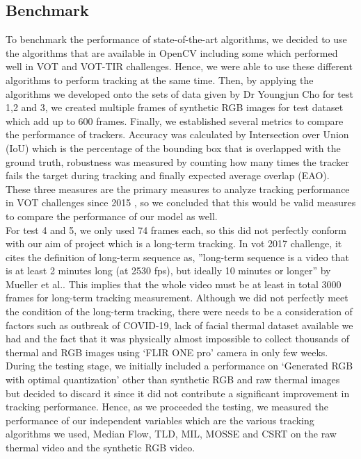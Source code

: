 \documentclass[conference]{IEEEtran}
\begin{document}
\subsection{Benchmark}
To benchmark the performance of state-of-the-art algorithms, we decided to use the algorithms that are available in OpenCV including some which performed well in VOT and VOT-TIR challenges. Hence, we were able to use these different algorithms to perform tracking at the same time. Then, by applying the algorithms we developed onto the sets of data given by Dr Youngjun Cho for test 1,2 and 3, we created multiple frames of synthetic RGB images for test dataset which add up to 600 frames. Finally, we established several metrics to compare the performance of trackers. Accuracy was calculated by Intersection over Union (IoU) which is the percentage of the bounding box that is overlapped with the ground truth, robustness was measured by counting how many times the tracker fails the target during tracking and finally expected average overlap (EAO). These three measures are the primary measures to analyze tracking performance in VOT challenges since 2015 \cite{b12}, so we concluded that this would be valid measures to compare the performance of our model as well.\\ For test 4 and 5, we only used 74 frames each, so this did not perfectly conform with our aim of project which is a long-term tracking. In vot 2017 challenge, it cites the definition of long-term sequence as, ”long-term sequence is a video that is at least 2 minutes long (at 2530 fps), but ideally 10 minutes or longer” by Mueller et al.\cite{b19}. This implies that the whole video must be at least in total 3000 frames for long-term tracking measurement. Although we did not perfectly meet the condition of the long-term tracking, there were needs to be a consideration of factors such as outbreak of COVID-19, lack of facial thermal dataset available we had and the fact that it was physically almost impossible to collect thousands of thermal and RGB images using ‘FLIR ONE pro’ camera in only few weeks.\\ During the testing stage, we initially included a performance on ‘Generated RGB with optimal quantization’ other than synthetic RGB and raw thermal images but decided to discard it since it did not contribute a significant improvement in tracking performance. Hence, as we proceeded the testing, we measured the performance of our independent variables which are the various tracking algorithms we used, Median Flow, TLD, MIL, MOSSE and CSRT on the raw thermal video and the synthetic RGB video. \\
\end{document}
